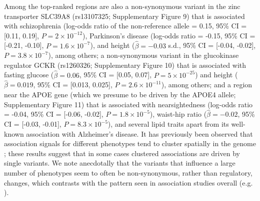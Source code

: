 \documentclass[11pt,titlepage]{article}
\begin{document}
Among the top-ranked regions are also a non-synonymous variant in the zinc transporter SLC39A8 (rs13107325; Supplementary Figure 9) that is associated with schizophrenia (log-odds ratio of the non-reference allele = 0.15, 95\% CI = [0.11, 0.19], $P = 2 \times 10^{-12}$), Parkinson's disease (log-odds ratio = -0.15, 95\% CI = [-0.21, -0.10], $P = 1.6 \times 10^{-7}$), and height ($\hat \beta = -0.03$ s.d., 95\% CI = [-0.04, -0.02], $P = 3.8\times 10^{-7}$), among others; a non-synonymous variant in the glucokinase regulator GCKR (rs1260326; Supplementary Figure 10) that is associated with fasting glucose ($\hat \beta = 0.06$, 95\% CI = [0.05, 0.07], $P =  5\times10^{-25}$) and height ($\hat \beta = 0.019$, 95\% CI = [0.013, 0.025], $P = 2.6\times 10^{-11}$), among others; and a region near the APOE gene (which we presume to be driven by the APOE4 allele; Supplementary Figure 11) that is associated with nearsightedness (log-odds ratio = -0.04, 95\% CI = [-0.06, -0.02], $P =  1.8 \times 10^{-5}$), waist-hip ratio ($\hat \beta = -0.02$, 95\% CI = [-0.03, -0.01], $P = 8.3\times 10^{-5}$), and several lipid traits apart from its well-known association with Alzheimer's disease. 
It has previously been observed that association signals for different phenotypes tend to cluster spatially in the genome \citep{Jeck:2012aa}; these results suggest that in some cases clustered associations are driven by single variants. 
We note anecdotally that the variants that influence a large number of phenotypes seem to often be non-synonymous, rather than regulatory, changes, which contrasts with the pattern seen in association studies overall (e.g. \citet{pickrell2013joint}).
\end{document}
